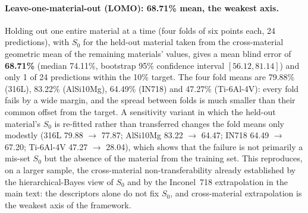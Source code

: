 \documentclass[12pt,a4paper,twocolumn]{article}
\begin{document}
\paragraph{Leave-one-material-out (LOMO): 68.71\% mean, the weakest axis.}
Holding out one entire material at a time (four folds of six points each, 24 predictions), with $S_0$ for
the held-out material taken from the cross-material geometric mean of the remaining materials' values,
gives a mean blind error of \textbf{68.71\%} (median 74.11\%, bootstrap 95\% confidence interval
$[56.12, 81.14]$) and only 1 of 24 predictions within the 10\% target. The four fold means are 79.88\%
(316L), 83.22\% (AlSi10Mg), 64.49\% (IN718) and 47.27\% (Ti-6Al-4V): every fold fails by a wide margin,
and the spread between folds is much smaller than their common offset from the target. A sensitivity
variant in which the held-out material's $S_0$ is re-fitted rather than transferred changes the fold
means only modestly (316L 79.88 $\to$ 77.87; AlSi10Mg 83.22 $\to$ 64.47; IN718 64.49 $\to$ 67.20;
Ti-6Al-4V 47.27 $\to$ 28.04), which shows that the failure is not primarily a mis-set $S_0$ but the
absence of the material from the training set. This reproduces, on a larger sample, the cross-material
non-transferability already established by the hierarchical-Bayes view of $S_0$ and by the Inconel~718
extrapolation in the main text: the descriptors alone do not fix $S_0$, and cross-material extrapolation
is the weakest axis of the framework.
\end{document}
